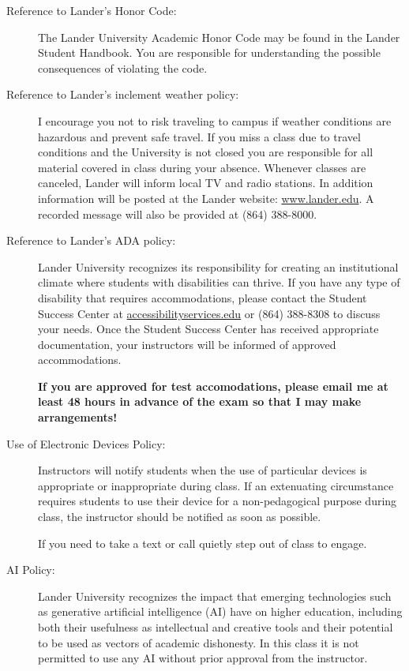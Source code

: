 \message{ !name(policies.tex)}\documentclass{article}
\begin{document}
\begin{description}
\item[Reference to Lander’s Honor Code:]
  The Lander University Academic Honor Code may be found in the Lander Student Handbook. You are responsible for understanding the possible consequences of violating the code.

\item[Reference to Lander’s inclement weather policy:]
  I encourage you not to risk traveling to campus if weather conditions are hazardous and prevent safe travel. If you miss a class due to travel conditions and the University is not closed you are responsible for all material covered in class during your absence. Whenever classes are canceled, Lander will inform local TV and radio stations. In addition information will be posted at the Lander website: \href{www.lander.edu}{www.lander.edu}. A recorded message will also be provided at (864) 388-8000.

\item[Reference to Lander’s ADA policy:]
  Lander University recognizes its responsibility for creating an
  institutional climate where students with disabilities can
  thrive. If you have any type of disability that requires
  accommodations, please contact the Student Success Center at
  \href{mailto:accessibilityservices@lander.edu}{accessibilityservices\allowbreak@lander.edu}
  or (864) 388-8308 to discuss your needs. Once the Student Success
  Center has received appropriate documentation, your instructors
  will be informed of approved accommodations.

  \textbf{If you are approved for test accomodations, please email me at
  least 48 hours in advance of the exam so that I may make arrangements!}

\item[Use of Electronic Devices Policy:]
  Instructors will notify students when the use of particular devices is appropriate or inappropriate during class. If an extenuating circumstance requires students to use their device for a non-pedagogical purpose during class, the instructor should be notified as soon as possible.

  If you need to take a text or call quietly step out of class to engage.

\item[AI Policy:]
  Lander University recognizes the impact that emerging technologies such as generative artificial intelligence (AI) have on higher education, including both their usefulness as intellectual and creative tools and their potential to be used as vectors of academic dishonesty. In this class it is not permitted to use any AI without prior approval from the instructor.


\end{description}
\end{document}
